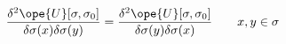 \begin{equation}	\label{12.32}
\frac{\delta^2\ope{U}[\sigma,\sigma_0]}{\delta\sigma(x)\delta\sigma(y)}
=
\frac{\delta^2\ope{U}[\sigma,\sigma_0]}{\delta\sigma(y)\delta\sigma(x)}
\qquad
x,y\in\sigma
	\end{equation}

